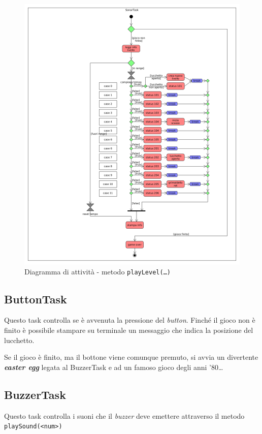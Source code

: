 \begin{figure}[!ht]
	\centering
	\includegraphics[scale=.35]{img/UML/sonartask.png}
	\caption{Diagramma di attività - metodo \texttt{playLevel(\dots)}}
\end{figure}

\newpage
\subsection{ButtonTask}
Questo task controlla se è avvenuta la pressione del \textit{button}.
Finché il gioco non è finito è possibile stampare su terminale un messaggio che indica la posizione del lucchetto. 

Se il gioco è finito, ma il bottone viene comunque premuto, si avvia un divertente \textbf{\textit{easter egg}} legata al BuzzerTask e ad un famoso gioco degli anni '80\dots


\subsection{BuzzerTask}
Questo task controlla i suoni che il \textit{buzzer} deve emettere attraverso il metodo \texttt{playSound(<num>)}

